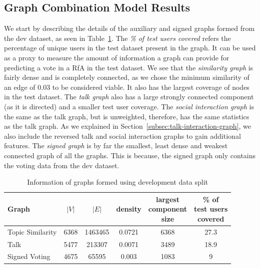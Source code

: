 \subsection{Graph Combination Model Results}
We start by describing the details of the auxiliary and signed graphs formed from the dev dataset, as seen in Table~\ref{tab:test-graphs}.
The \textit{\% of test users covered} refers the percentage of unique users in the test dataset present in the graph. 
It can be used as a proxy to measure the amount of information a graph can provide for predicting a vote in a RfA in the test dataset.
We see that the \textit{similarity graph} is fairly dense and is completely connected, as we chose the minimum similarity of an edge of $0.03$ to be considered viable.
It also has the largest coverage of nodes in the test dataset.
The \textit{talk graph} also has a large strongly connected component (as it is directed) and a smaller test user coverage.
The \textit{social interaction graph} is the same as the talk graph, but is unweighted, therefore, has the same statistics as the talk graph.
As we explained in Section~\ref{subsec:talk-interaction-graph}, we also include the reversed talk and social interaction graphs to gain additional features.
The \textit{signed graph} is by far the smallest, least dense and weakest connected graph of all the graphs.
This is because, the signed graph only contains the voting data from the dev dataset.

\begin{table}[htp]
    \centering
    \caption{Information of graphs formed using development data split}
    \label{tab:test-graphs}
    \begin{tabular}{lccccc}
        \toprule
        Graph & $|V|$ & $|E|$ & density & \shortstack{largest\\  component \\size} & \shortstack{\% of \\test users\\ covered}\\ 
        \midrule
        
        Topic Similarity & 6368 &1463465 & 0.0721 & 6368 & 27.3\\
        
        Talk  & 5477 & 213307 & 0.0071 & 3489 & 18.9\\

        Signed Voting & 4675 & 65595 & 0.003 & 1083 & 9\\

        \bottomrule
        \end{tabular}
\end{table}

